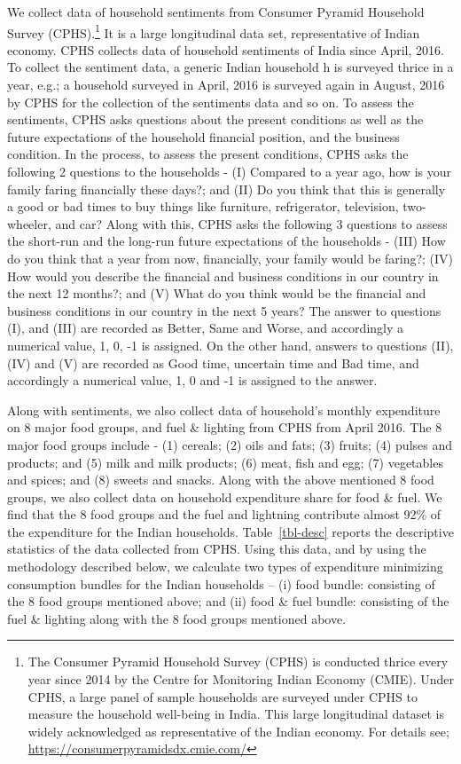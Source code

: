 \documentclass[
  abstract]{scrartcl}
\begin{document}
We collect data of household sentiments from Consumer Pyramid Household
Survey (CPHS).\footnote{The Consumer Pyramid Household Survey (CPHS) is
  conducted thrice every year since 2014 by the Centre for Monitoring
  Indian Economy (CMIE). Under CPHS, a large panel of sample households
  are surveyed under CPHS to measure the household well-being in India.
  This large longitudinal dataset is widely acknowledged as
  representative of the Indian economy. For details see;
  \url{https://consumerpyramidsdx.cmie.com/}} It is a large longitudinal
data set, representative of Indian economy. CPHS collects data of
household sentiments of India since April, 2016. To collect the
sentiment data, a generic Indian household h is surveyed thrice in a
year, e.g.; a household surveyed in April, 2016 is surveyed again in
August, 2016 by CPHS for the collection of the sentiments data and so
on. To assess the sentiments, CPHS asks questions about the present
conditions as well as the future expectations of the household financial
position, and the business condition. In the process, to assess the
present conditions, CPHS asks the following 2 questions to the
households - (I) Compared to a year ago, how is your family faring
financially these days?; and (II) Do you think that this is generally a
good or bad times to buy things like furniture, refrigerator,
television, two-wheeler, and car? Along with this, CPHS asks the
following 3 questions to assess the short-run and the long-run future
expectations of the households - (III) How do you think that a year from
now, financially, your family would be faring?; (IV) How would you
describe the financial and business conditions in our country in the
next 12 months?; and (V) What do you think would be the financial and
business conditions in our country in the next 5 years? The answer to
questions (I), and (III) are recorded as Better, Same and Worse, and
accordingly a numerical value, 1, 0, -1 is assigned. On the other hand,
answers to questions (II), (IV) and (V) are recorded as Good time,
uncertain time and Bad time, and accordingly a numerical value, 1, 0 and
-1 is assigned to the answer.

Along with sentiments, we also collect data of household's monthly
expenditure on 8 major food groups, and fuel \& lighting from CPHS from
April 2016. The 8 major food groups include - (1) cereals; (2) oils and
fats; (3) fruits; (4) pulses and products; and (5) milk and milk
products; (6) meat, fish and egg; (7) vegetables and spices; and (8)
sweets and snacks. Along with the above mentioned 8 food groups, we also
collect data on household expenditure share for food \& fuel. We find
that the 8 food groups and the fuel and lightning contribute almost 92\%
of the expenditure for the Indian households. Table~\ref{tbl-desc}
reports the descriptive statistics of the data collected from CPHS.
Using this data, and by using the methodology described below, we
calculate two types of expenditure minimizing consumption bundles for
the Indian households -- (i) food bundle: consisting of the 8 food
groups mentioned above; and (ii) food \& fuel bundle: consisting of the
fuel \& lighting along with the 8 food groups mentioned above.
\end{document}
